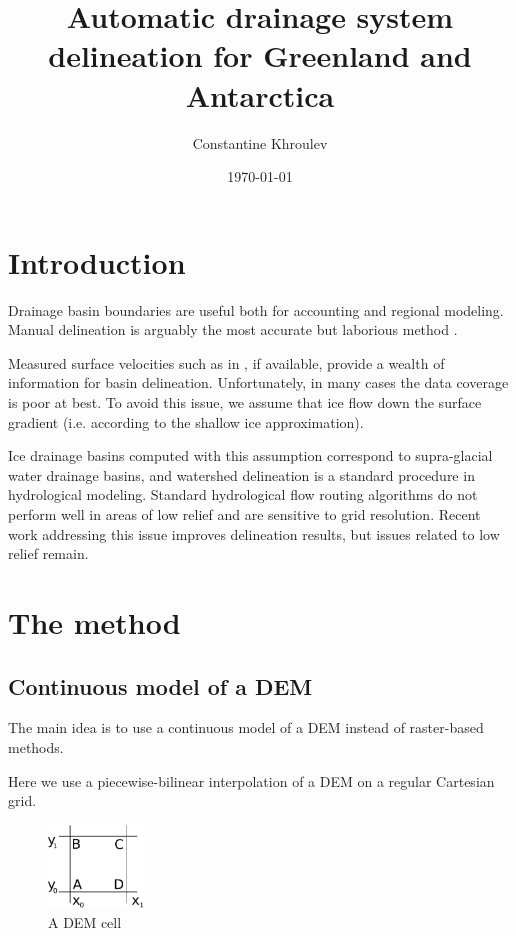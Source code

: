 \documentclass{amsart}
\begin{document}
\title{Automatic drainage system delineation for Greenland and Antarctica}
\author{Constantine Khroulev}
\date{\today}
\maketitle

\section{Introduction}
\label{sec:introduction}
Drainage basin boundaries are useful both for accounting and regional modeling.
Manual delineation is arguably the most accurate but laborious method \cite{zwally2012}.

Measured surface velocities such as in \cite{joughin2010greenland}, if
available, provide a wealth of information for basin delineation.
Unfortunately, in many cases the data coverage is poor at best. To avoid this
issue, we assume that ice flow down the surface gradient (i.e. according to the
shallow ice approximation).

Ice drainage basins computed with this assumption correspond to supra-glacial
water drainage basins, and watershed delineation is a standard procedure in
hydrological modeling. Standard hydrological flow routing algorithms
\cite{lea1992aspect,jenson1988extracting,costa1994digital} do not perform well
in areas of low relief and are sensitive to grid resolution. Recent work
addressing this issue
\cite{schwanghart2010topotoolbox,seibert2007new,liang2000general,tarboton1997new}
improves delineation results, but issues related to low relief remain.

\section{The method}
\label{sec:method}

\subsection{Continuous model of a DEM}
\label{sec:continuous-model-dem}

The main idea is to use a continuous model of a DEM instead of raster-based methods.

Here we use a piecewise-bilinear interpolation of a DEM on a regular Cartesian grid.

\begin{figure}[h]
  \centering
  \includegraphics[width=1in]{cell.pdf}
  \caption{A DEM cell}
  \label{fig:cell}
\end{figure}
\end{document}
